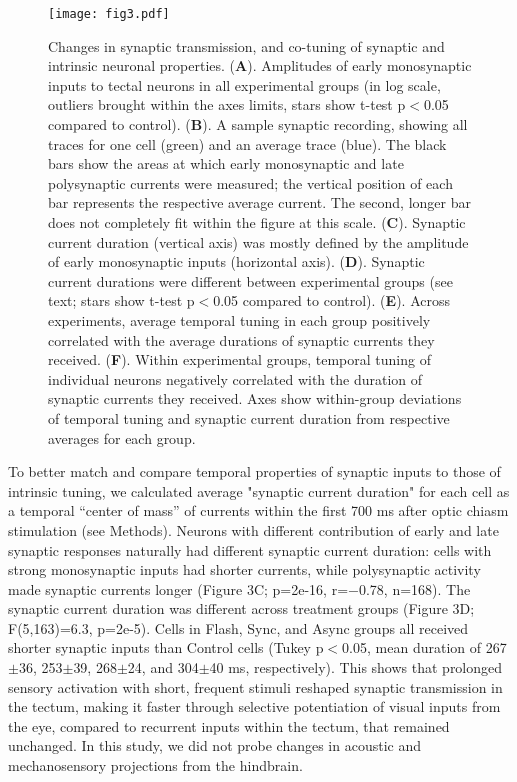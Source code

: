 \documentclass{article}
\begin{document}
\begin{figure*}[!t]
\texttt{[image: fig3.pdf]}
\caption{Changes in synaptic transmission, and co-tuning of synaptic and intrinsic neuronal properties. (\textbf{A}). Amplitudes of early monosynaptic inputs to tectal neurons in all experimental groups (in log scale, outliers brought within the axes limits, stars show t-test p$<$0.05 compared to control). (\textbf{B}). A sample synaptic recording, showing all traces for one cell (green) and an average trace (blue). The black bars show the areas at which early monosynaptic and late polysynaptic currents were measured; the vertical position of each bar represents the respective average current. The second, longer bar does not completely fit within the figure at this scale. (\textbf{C}). Synaptic current duration (vertical axis) was mostly defined by the amplitude of early monosynaptic inputs (horizontal axis). (\textbf{D}). Synaptic current durations were different between experimental groups (see text; stars show t-test p$<$0.05 compared to control). (\textbf{E}). Across experiments, average temporal tuning in each group positively correlated with the average durations of synaptic currents they received. (\textbf{F}). Within experimental groups, temporal tuning of individual neurons negatively correlated with the duration of synaptic currents they received. Axes show within-group deviations of temporal tuning and synaptic current duration from respective averages for each group.}
\end{figure*}

To better match and compare temporal properties of synaptic inputs to those of intrinsic tuning, we calculated average "synaptic current duration" for each cell as a temporal “center of mass” of currents within the first 700 ms after optic chiasm stimulation (see Methods). Neurons with different contribution of early and late synaptic responses naturally had different synaptic current duration: cells with strong monosynaptic inputs had shorter currents, while polysynaptic activity made synaptic currents longer (Figure 3C; p=2e-16, r=$-$0.78, n=168). The synaptic current duration was different across treatment groups (Figure 3D; F(5,163)=6.3, p=2e-5). Cells in Flash, Sync, and Async groups all received shorter synaptic inputs than Control cells (Tukey p$<$0.05, mean duration of 267$\pm$36, 253$\pm$39, 268$\pm$24, and 304$\pm$40 ms, respectively). This shows that prolonged sensory activation with short, frequent stimuli reshaped synaptic transmission in the tectum, making it faster through selective potentiation of visual inputs from the eye, compared to recurrent inputs within the tectum, that remained unchanged. In this study, we did not probe changes in acoustic and mechanosensory projections from the hindbrain.
\end{document}
